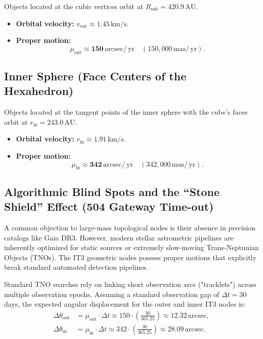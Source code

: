\documentclass[11pt,a4paper]{article}
\theoremstyle{remark}
\newcommand{\AU}{\,\mathrm{AU}}
\newcommand{\mas}{\,\mathrm{mas}}
\newcommand{\yr}{\,\mathrm{yr}}
\newcommand{\arcsec}{\,\mathrm{arcsec}}
\begin{document}
Objects located at the cubic vertices orbit at $R_{\text{out}} = 420.9\AU$.
\begin{itemize}[leftmargin=2em]
    \item \textbf{Orbital velocity:} $v_{\text{out}} \approx 1.45\,\mathrm{km/s}$.
    \item \textbf{Proper motion:} 
    \begin{equation}
        \mu_{\text{out}} \approx \mathbf{150\arcsec/\yr} \quad (150{,}000\mas/\yr).
        \label{eq:mu_out}
    \end{equation}
\end{itemize}

\subsection{Inner Sphere (Face Centers of the Hexahedron)}

Objects located at the tangent points of the inner sphere with the cube's faces orbit at $r_{\text{in}} = 243.0\AU$.
\begin{itemize}[leftmargin=2em]
    \item \textbf{Orbital velocity:} $v_{\text{in}} \approx 1.91\,\mathrm{km/s}$.
    \item \textbf{Proper motion:} 
    \begin{equation}
        \mu_{\text{in}} \approx \mathbf{342\arcsec/\yr} \quad (342{,}000\mas/\yr).
        \label{eq:mu_in}
    \end{equation}
\end{itemize}

\subsection{Algorithmic Blind Spots and the ``Stone Shield'' Effect (504 Gateway Time-out)}

A common objection to large-mass topological nodes is their absence in precision catalogs like Gaia DR3. However, modern stellar astrometric pipelines are inherently optimized for static sources or extremely slow-moving Trans-Neptunian Objects (TNOs). The IT3 geometric nodes possess proper motions that explicitly break standard automated detection pipelines.

Standard TNO searches rely on linking short observation arcs ("tracklets") across multiple observation epochs. Assuming a standard observation gap of $\Delta t = 30$ days, the expected angular displacement for the outer and inner IT3 nodes is:
\begin{align}
    \Delta\theta_{\text{out}} &= \mu_{\text{out}} \cdot \Delta t \approx 150 \cdot \left(\frac{30}{365.25}\right) \approx 12.32 \arcsec, \label{eq:shift_out} \\
    \Delta\theta_{\text{in}} &= \mu_{\text{in}} \cdot \Delta t \approx 342 \cdot \left(\frac{30}{365.25}\right) \approx 28.09 \arcsec. \label{eq:shift_in}
\end{align}
\end{document}
